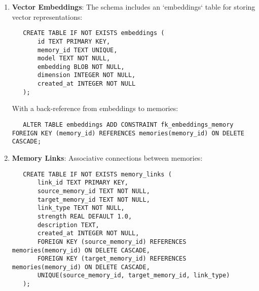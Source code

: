 \documentclass[12pt,a4paper]{article}
\begin{document}
\begin{enumerate}[label=\arabic*.]
    \item \textbf{Vector Embeddings}: The schema includes an `embeddings` table for storing vector representations:
    \begin{pageablecode}
    \begin{verbatim}
   CREATE TABLE IF NOT EXISTS embeddings (
       id TEXT PRIMARY KEY,
       memory_id TEXT UNIQUE,
       model TEXT NOT NULL,
       embedding BLOB NOT NULL,
       dimension INTEGER NOT NULL,
       created_at INTEGER NOT NULL
   );
    \end{verbatim}
    \end{pageablecode}
    With a back-reference from embeddings to memories:
    \begin{pageablecode}
    \begin{verbatim}
   ALTER TABLE embeddings ADD CONSTRAINT fk_embeddings_memory FOREIGN KEY (memory_id) REFERENCES memories(memory_id) ON DELETE CASCADE;
    \end{verbatim}
    \end{pageablecode}

    \item \textbf{Memory Links}: Associative connections between memories:
    \begin{pageablecode}
    \begin{verbatim}
   CREATE TABLE IF NOT EXISTS memory_links (
       link_id TEXT PRIMARY KEY,
       source_memory_id TEXT NOT NULL,
       target_memory_id TEXT NOT NULL,
       link_type TEXT NOT NULL,
       strength REAL DEFAULT 1.0,
       description TEXT,
       created_at INTEGER NOT NULL,
       FOREIGN KEY (source_memory_id) REFERENCES memories(memory_id) ON DELETE CASCADE,
       FOREIGN KEY (target_memory_id) REFERENCES memories(memory_id) ON DELETE CASCADE,
       UNIQUE(source_memory_id, target_memory_id, link_type)
   );
    \end{verbatim}
    \end{pageablecode}


\end{enumerate}
\end{document}
